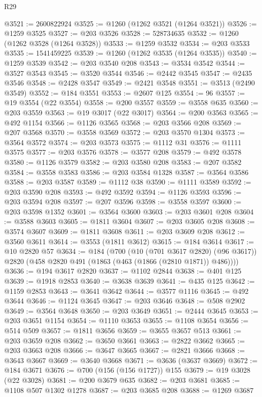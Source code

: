 \begin{lexlean}{R29}
\begin{coremodule}
@3521 := 2600822924
@3525 := @1260 (@1262 @3521 (@1264 @3521))
@3526 := @1259 @3525
@3527 := @203 @3526
@3528 := 528734635
@3532 := @1260 (@1262 @3528 (@1264 @3528))
@3533 := @1259 @3532
@3534 := @203 @3533
@3535 := 1541459225
@3539 := @1260 (@1262 @3535 (@1264 @3535))
@3540 := @1259 @3539
@3542 := @203 @3540 @208
@3543 := @3534 @3542
@3544 := @3527 @3543
@3545 := @3520 @3544
@3546 := @2442 @3545
@3547 := @2435 @3546
@3548 := @2428 @3547
@3549 := @2421 @3548
@3551 := @3513 (@2490 @3549)
@3552 := @184 @3551
@3553 := @2607 @125
@3554 := 96
@3557 := @19 @3554 (@22 @3554)
@3558 := @200 @3557
@3559 := @3558 @635
@3560 := @203 @3559
@3563 := @19 @3017 (@22 @3017)
@3564 := @200 @3563
@3565 := @492 @1154
@3566 := @1126 @3565
@3568 := @203 @3566 @208
@3569 := @207 @3568
@3570 := @3558 @3569
@3572 := @203 @3570 @1304
@3573 := @3564 @3572
@3574 := @203 @3573
@3575 := @1112 @31
@3576 := @1111 @3575
@3577 := @203 @3576
@3578 := @3577 @208
@3579 := @492 @3578
@3580 := @1126 @3579
@3582 := @203 @3580 @208
@3583 := @207 @3582
@3584 := @3558 @3583
@3586 := @203 @3584 @1328
@3587 := @3564 @3586
@3588 := @203 @3587
@3589 := @1112 @38
@3590 := @1111 @3589
@3592 := @203 @3590 @208
@3593 := @492 @3592
@3594 := @1126 @3593
@3596 := @203 @3594 @208
@3597 := @207 @3596
@3598 := @3558 @3597
@3600 := @203 @3598 @1352
@3601 := @3564 @3600
@3603 := @203 @3601 @208
@3604 := @3588 @3603
@3605 := @1811 @3604
@3607 := @203 @3605 @208
@3608 := @3574 @3607
@3609 := @1811 @3608
@3611 := @203 @3609 @208
@3612 := @3560 @3611
@3614 := @3553 (@1811 @3612)
@3615 := @184 @3614
@3617 := @10 @2820 @57
@3634 := @184
    (@700
      (@10 (@701 @3617 @2820) (@96 @3617))
      @2820
      (@458 @2820 @491 (@1863 (@463 (@1866 (@2810 @1871)) @486))))
@3636 := @194 @3617 @2820
@3637 := @1102 @2844
@3638 := @401 @125
@3639 := @1918 @2853
@3640 := @3638 @3639
@3641 := @435 @125
@3642 := @1159 @2853
@3643 := @3641 @3642
@3644 := @3577 @1116
@3645 := @492 @3644
@3646 := @1124 @3645
@3647 := @203 @3646
@3648 := @508 @2902
@3649 := @3564 @3648
@3650 := @203 @3649
@3651 := @2444 @3645
@3653 := @203 @3651 @1154
@3654 := @1110 @3653
@3655 := @1108 @3654
@3656 := @514 @509
@3657 := @1811 @3656
@3659 := @3655 @3657 @513
@3661 := @203 @3659 @208
@3662 := @3650 @3661
@3663 := @2822 @3662
@3665 := @203 @3663 @208
@3666 := @3647 @3665
@3667 := @2821 @3666
@3668 := @3643 @3667
@3669 := @3640 @3668
@3671 := @3636 (@3637 @3669)
@3672 := @184 @3671
@3676 := @700 (@156 (@156 @1727)) @155
@3679 := @19 @3028 (@22 @3028)
@3681 := @200 @3679 @635
@3682 := @203 @3681
@3685 := @1108 @507 @1302 @1278
@3687 := @203 @3685 @208
@3688 := @1269 @3687

\end{coremodule}
\end{lexlean}
